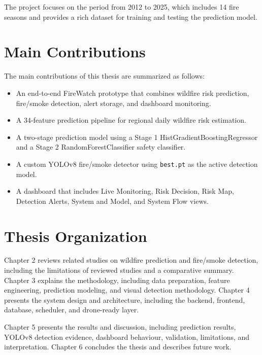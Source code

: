 The project focuses on the period from 2012 to 2025, which includes 14 fire seasons
and provides a rich dataset for training and testing the prediction model.
\section{Main Contributions}

The main contributions of this thesis are summarized as follows:

\begin{itemize}
  \item An end-to-end FireWatch prototype that combines wildfire risk
  prediction, fire/smoke detection, alert storage, and dashboard monitoring.
  \item A 34-feature prediction pipeline for regional daily wildfire risk
  estimation.
  \item A two-stage prediction model using a Stage 1
  HistGradientBoostingRegressor and a Stage 2 RandomForestClassifier safety
  classifier.
  \item A custom YOLOv8 fire/smoke detector using \texttt{best.pt} as the
  active detection model.
  \item A dashboard that includes Live Monitoring, Risk Decision, Risk Map,
  Detection Alerts, System and Model, and System Flow views.
\end{itemize}

\section{Thesis Organization}

Chapter 2 reviews related studies on wildfire prediction and fire/smoke
detection, including the limitations of reviewed studies and a comparative
summary. Chapter 3 explains the methodology, including data preparation,
feature engineering, prediction modeling, and visual detection methodology.
Chapter 4 presents the system design and architecture, including the backend,
frontend, database, scheduler, and drone-ready layer.

Chapter 5 presents the results and discussion, including prediction results,
YOLOv8 detection evidence, dashboard behaviour, validation, limitations, and
interpretation. Chapter 6 concludes the thesis and describes future work.